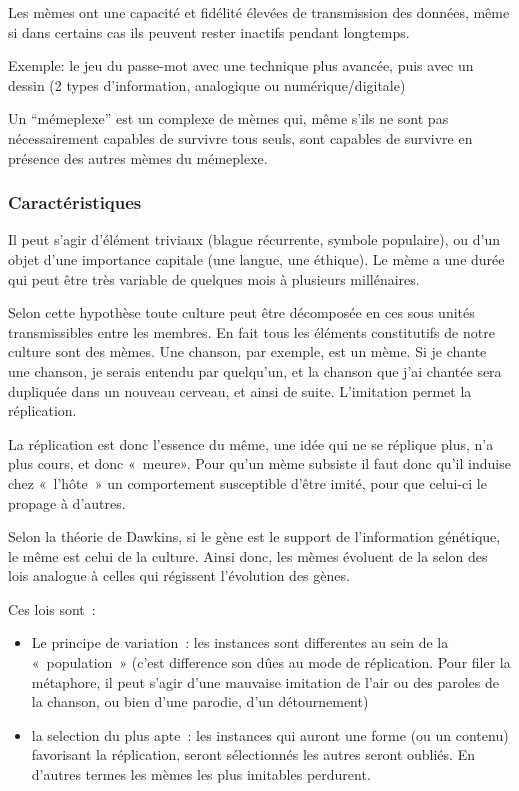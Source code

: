 \documentclass[12pt]{article}
\providecommand{\tightlist}{%
  \setlength{\itemsep}{0pt}\setlength{\parskip}{0pt}}
\begin{document}
Les mèmes ont une capacité et fidélité élevées de transmission des
données, même si dans certains cas ils peuvent rester inactifs pendant
longtemps.

Exemple: le jeu du passe-mot avec une technique plus avancée, puis avec
un dessin (2 types d'information, analogique ou numérique/digitale) \cite{dio}

Un ``mémeplexe'' est un complexe de mèmes qui, même s'ils ne sont pas
nécessairement capables de survivre tous seuls, sont capables de
survivre en présence des autres mèmes du mémeplexe.


\subsubsection{Caractéristiques}

Il peut s'agir d'élément triviaux (blague récurrente, symbole
populaire), ou d'un objet d'une importance capitale (une langue, une
éthique). Le mème a une durée qui peut être très variable de quelques
mois à plusieurs millénaires.

Selon cette hypothèse toute culture peut être décomposée en ces sous
unités transmissibles entre les membres. En fait tous les éléments
constitutifs de notre culture sont des mèmes. Une chanson, par exemple,
est un mème. Si je chante une chanson, je serais entendu par quelqu'un,
et la chanson que j'ai chantée sera dupliquée dans un nouveau cerveau,
et ainsi de suite. L'imitation permet la réplication.

La réplication est donc l'essence du même, une idée qui ne se réplique
plus, n'a plus cours, et donc «~meure». Pour qu'un mème subsiste il faut
donc qu'il induise chez «~l'hôte~» un comportement susceptible d'être
imité, pour que celui-ci le propage à d'autres.

Selon la théorie de Dawkins, si le gène est le support de l'information
génétique, le même est celui de la culture. Ainsi donc, les mèmes
évoluent de la selon des lois analogue à celles qui régissent
l'évolution des gènes. \cite{dion:hal-00765151}

Ces lois sont~:

\begin{itemize}
\tightlist
\item
  Le principe de variation~: les instances sont differentes au sein de
  la «~population~» (c'est difference son dûes au mode de réplication.
  Pour filer la métaphore, il peut s'agir d'une mauvaise imitation de
  l'air ou des paroles de la chanson, ou bien d'une parodie, d'un
  détournement)
\item
  la selection du plus apte~: les instances qui auront une forme (ou un
  contenu) favorisant la réplication, seront sélectionnés les autres
  seront oubliés. En d'autres termes les mèmes les plus imitables
  perdurent.
\end{itemize}
\end{document}
